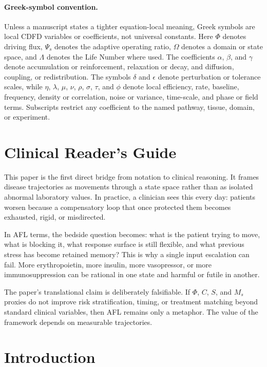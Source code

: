\documentclass[11pt]{article}
\begin{document}
\paragraph{Greek-symbol convention.}
Unless a manuscript states a tighter equation-local meaning, Greek symbols are local CDFD variables or coefficients, not universal constants. Here $\Phi$ denotes driving flux, $\Psi_s$ denotes the adaptive operating ratio, $\Omega$ denotes a domain or state space, and $\Lambda$ denotes the Life Number where used. The coefficients $\alpha$, $\beta$, and $\gamma$ denote accumulation or reinforcement, relaxation or decay, and diffusion, coupling, or redistribution. The symbols $\delta$ and $\epsilon$ denote perturbation or tolerance scales, while $\eta$, $\lambda$, $\mu$, $\nu$, $\rho$, $\sigma$, $\tau$, and $\phi$ denote local efficiency, rate, baseline, frequency, density or correlation, noise or variance, time-scale, and phase or field terms. Subscripts restrict any coefficient to the named pathway, tissue, domain, or experiment.

\section*{Clinical Reader's Guide}
This paper is the first direct bridge from notation to clinical reasoning. It frames disease trajectories as movements through a state space rather than as isolated abnormal laboratory values. In practice, a clinician sees this every day: patients worsen because a compensatory loop that once protected them becomes exhausted, rigid, or misdirected.

In AFL terms, the bedside question becomes: what is the patient trying to move, what is blocking it, what response surface is still flexible, and what previous stress has become retained memory? This is why a single input escalation can fail. More erythropoietin, more insulin, more vasopressor, or more immunosuppression can be rational in one state and harmful or futile in another.

The paper's translational claim is deliberately falsifiable. If $\Phi$, $C$, $S$, and $M_s$ proxies do not improve risk stratification, timing, or treatment matching beyond standard clinical variables, then AFL remains only a metaphor. The value of the framework depends on measurable trajectories.


\section{Introduction}
\end{document}
